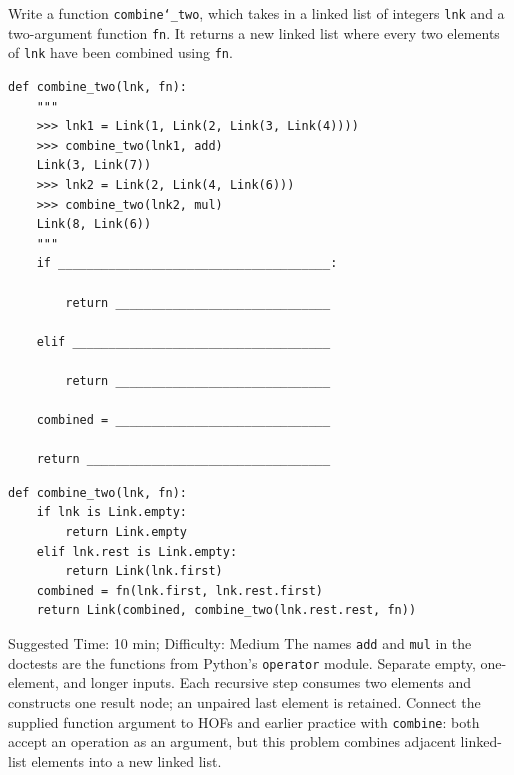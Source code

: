 \begin{blocksection}
\question Write a function \texttt{combine\char`_two}, which takes in a linked list of integers \texttt{lnk} and a two-argument function \texttt{fn}. It returns a new linked list where every two elements of \texttt{lnk} have been combined using \texttt{fn}.\\

\begin{lstlisting}
def combine_two(lnk, fn):
    """
    >>> lnk1 = Link(1, Link(2, Link(3, Link(4))))
    >>> combine_two(lnk1, add)
    Link(3, Link(7))
    >>> lnk2 = Link(2, Link(4, Link(6)))
    >>> combine_two(lnk2, mul)
    Link(8, Link(6))
    """
    if ______________________________________:

        return ______________________________

    elif ____________________________________

        return ______________________________

    combined = ______________________________

    return __________________________________
\end{lstlisting}

\begin{solution}[1in]
\begin{lstlisting}
def combine_two(lnk, fn):
    if lnk is Link.empty:
        return Link.empty
    elif lnk.rest is Link.empty:
        return Link(lnk.first)
    combined = fn(lnk.first, lnk.rest.first)
    return Link(combined, combine_two(lnk.rest.rest, fn))
\end{lstlisting}
\end{solution}

\end{blocksection}

\begin{questionmeta}
    Suggested Time: 10 min; Difficulty: Medium
    The names \lstinline{add} and \lstinline{mul} in the doctests are the functions from Python's \lstinline{operator} module. Separate empty, one-element, and longer inputs. Each recursive step consumes two elements and constructs one result node; an unpaired last element is retained. Connect the supplied function argument to HOFs and earlier practice with \lstinline{combine}: both accept an operation as an argument, but this problem combines adjacent linked-list elements into a new linked list.
\end{questionmeta}
